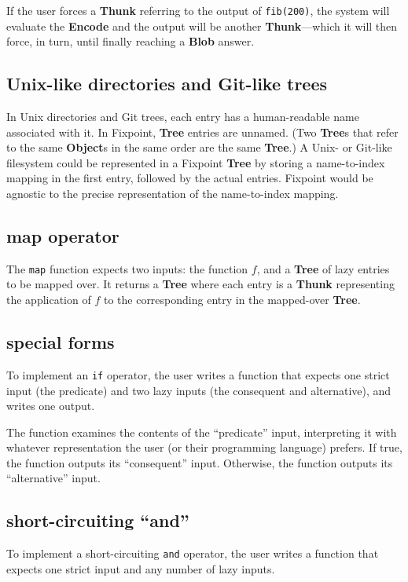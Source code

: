 \documentclass{article}
\newcommand{\blob}{\textbf{Blob}\xspace}
\newcommand{\objects}{\textbf{Object}s\xspace}
\newcommand{\encode}{\textbf{Encode}\xspace}
\newcommand{\thunk}{\textbf{Thunk}\xspace}
\newcommand{\tree}{\textbf{Tree}\xspace}
\newcommand{\trees}{\textbf{Tree}s\xspace}
\newcommand{\bs}{\vspace{\baselineskip}}
\begin{document}
If the user forces a \thunk referring to the output of \texttt{fib(200)}, the system will
evaluate the \encode and the output will be another \thunk---which it will then force, in turn,
until finally reaching a \blob answer.

\subsection{Unix-like directories and Git-like trees}

In Unix directories and Git trees, each entry has a human-readable
name associated with it. In Fixpoint, \tree entries are unnamed. (Two
\trees that refer to the same \objects in the same order are the same
\tree.) A Unix- or Git-like filesystem could be represented in a
Fixpoint \tree by storing a name-to-index mapping in the first entry,
followed by the actual entries. Fixpoint would be agnostic to the
precise representation of the name-to-index mapping.

\subsection{map operator} The \texttt{map} function expects
two inputs: the function $f$, and a \tree of lazy entries to be mapped
over. It returns a \tree where each entry is a \thunk representing the
application of $f$ to the corresponding entry in the mapped-over
\tree.

\subsection{special forms} To implement an \texttt{if}
operator, the user writes a function that expects one strict input
(the predicate) and two lazy inputs (the consequent and alternative),
and writes one output.

\bs

The function examines the contents of the ``predicate'' input,
interpreting it with whatever representation the user (or their
programming language) prefers. If true, the function outputs its
``consequent'' input. Otherwise, the function outputs its
``alternative'' input.

\subsection{short-circuiting ``and''} To implement a
short-circuiting \texttt{and} operator, the user writes a function
that expects one strict input and any number of lazy inputs.
\end{document}
